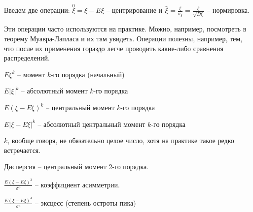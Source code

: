 Введем две операции: $\stackrel{0}{\xi} = \xi - E\xi$  -- центрирование и $\stackrel{\sim}{\xi} = \frac{\xi}{\sigma_\xi} = \frac{\xi}{\sqrt{D\xi}}$ -- нормировка.

Эти операции часто используются на практике. Можно, например, посмотреть в теорему Муавра-Лапласа и их там увидеть.
Операции полезны, например, тем, что после их применения гораздо легче проводить какие-либо сравнения распределений.

\begin{Def}
$E\xi^k$ -- момент $k$-го порядка (начальный)

$E|\xi|^k$ -- абсолютный момент $k$-го порядка

$E(\xi - E\xi)^k$ -- центральный момент $k$-го порядка

$E|\xi - E\xi|^k$ -- абсолютный центральный момент $k$-го порядка
\end{Def}
\begin{Rem}
$k$, вообще говоря, не обязательно целое число, хотя на практике такое редко встречается.
\end{Rem}
\begin{Rem}
Дисперсия -- центральный момент 2-го порядка.
\end{Rem}
\begin{Rem}
$\frac{E(\xi - E\xi)^3}{\sigma^3}$ -- коэффициент асимметрии.
\end{Rem}
\begin{Rem}
$\frac{E(\xi - E\xi)^4}{\sigma^4}$ -- эксцесс (степень остроты пика)
\end{Rem}
